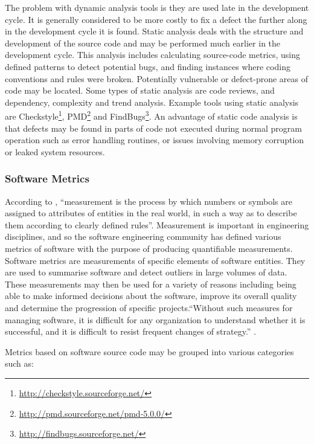 The problem with dynamic analysis tools is they are used late in the development cycle. It is generally considered to be more costly to fix a defect the further along in the development cycle it is found. Static analysis deals with the structure and development of the source code and may be performed much earlier in the development cycle. This analysis includes calculating source-code metrics, using defined patterns to detect potential bugs, and finding instances where coding conventions and rules were broken. Potentially vulnerable or defect-prone areas of code may be located. Some types of static analysis are code reviews, and dependency, complexity and trend analysis. Example tools using static analysis are Checkstyle\footnote{\url{http://checkstyle.sourceforge.net/}}, PMD\footnote{\url{http://pmd.sourceforge.net/pmd-5.0.0/}} and FindBugs\footnote{\url{http://findbugs.sourceforge.net/}}. An advantage of static code analysis is that defects may be found in parts of code not executed during normal program operation such as error handling routines, or issues involving memory corruption or leaked system resources. %

\subsubsection{Software Metrics}

According to \citet{fenton98}, ``measurement is the process by which numbers or symbols are assigned to attributes of entities in the real world, in such a way as to describe them according to clearly defined rules''.  Measurement is important in engineering disciplines, and so the software engineering community has defined various metrics of software with the purpose of producing quantifiable measurements. Software metrics are measurements of specific elements of software entities. They are used to summarise software and detect outliers in large volumes of data. These measurements may then be used for a variety of reasons including being able to make informed decisions about the software, improve its overall quality and determine the progression of specific projects.``Without such measures for managing software, it is difficult for any organization to understand whether it is successful, and it is difficult to resist frequent changes of strategy.'' \citep{grady92}.

Metrics based on software source code may be grouped into various categories such as:

